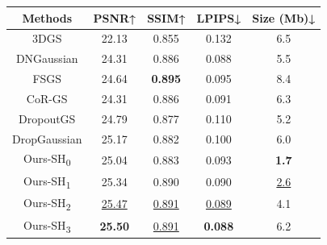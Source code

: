 \begin{tabular}{c|cccc}
\toprule
Methods & PSNR↑ & SSIM↑ & LPIPS↓ & Size (Mb)↓ \\
\midrule
3DGS  & 22.13 & 0.855 & 0.132  & 6.5 \\
DNGaussian & 24.31 & 0.886 & 0.088 & 5.5 \\
FSGS  & 24.64 & \textbf{0.895} & 0.095 & 8.4 \\
CoR-GS & 24.31 & 0.886 & 0.091 & 6.3 \\
DropoutGS & 24.79 & 0.877 & 0.110  & 5.2 \\
DropGaussian & 25.17 & 0.882 & 0.100  & 6.0  \\
\midrule
Ours-SH\textsubscript{0} & 25.04 & 0.883 & 0.093 & \textbf{1.7} \\
Ours-SH\textsubscript{1} & 25.34 & 0.890  & 0.090  & \underline{2.6} \\
Ours-SH\textsubscript{2} & \underline{25.47} & \underline{0.891} & \underline{0.089} & 4.1 \\
Ours-SH\textsubscript{3} & \textbf{25.50 } & \underline{0.891} & \textbf{0.088} & 6.2 \\
\bottomrule
\end{tabular}%
